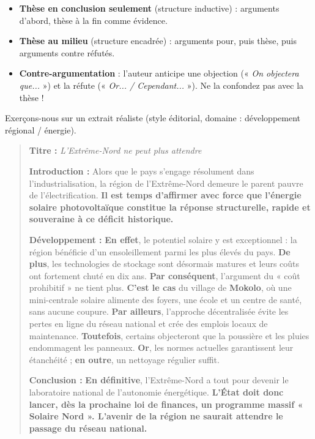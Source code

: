 \documentclass[11pt]{article}
\newcounter{popsec}
\newcounter{popsub}
\newcommand{\courssub}[1]{%
  \stepcounter{popsub}%
  \par\vspace{9pt}\noindent{\popxbold\fontsize{11.5}{13}\selectfont\color{popink}{\color{poporange}\thepopsec.\thepopsub}\hspace{6pt}#1}\par\nopagebreak\vspace{4pt}
}
\begin{document}
\begin{aretenir}
\begin{itemize}
    \item \textbf{Thèse en conclusion seulement} (structure inductive) : arguments d'abord, thèse à la fin comme évidence.
    \item \textbf{Thèse au milieu} (structure encadrée) : arguments pour, puis thèse, puis arguments contre réfutés.
    \item \textbf{Contre-argumentation} : l'auteur anticipe une objection (« \emph{On objectera que...} ») et la réfute (« \emph{Or... / Cependant...} »). Ne la confondez pas avec la thèse !
\end{itemize}
\end{aretenir}

\courssub{Application : repérage dans un éditorial}

Exerçons-nous sur un extrait réaliste (style éditorial, domaine : développement régional / énergie).

\begin{exemplebox}
\begin{quote}
\textbf{Titre :} \textit{L'Extrême-Nord ne peut plus attendre}

\textbf{Introduction :} Alors que le pays s'engage résolument dans l'industrialisation, la région de l'Extrême-Nord demeure le parent pauvre de l'électrification. \textbf{Il est temps d'affirmer avec force que l'énergie solaire photovoltaïque constitue la réponse structurelle, rapide et souveraine à ce déficit historique.}

\textbf{Développement :} \textbf{En effet}, le potentiel solaire y est exceptionnel : la région bénéficie d'un ensoleillement parmi les plus élevés du pays. \textbf{De plus}, les technologies de stockage sont désormais matures et leurs coûts ont fortement chuté en dix ans. \textbf{Par conséquent}, l'argument du « coût prohibitif » ne tient plus. \textbf{C'est le cas} du village de \textbf{Mokolo}, où une mini-centrale solaire alimente des foyers, une école et un centre de santé, sans aucune coupure. \textbf{Par ailleurs}, l'approche décentralisée évite les pertes en ligne du réseau national et crée des emplois locaux de maintenance. \textbf{Toutefois}, certains objecteront que la poussière et les pluies endommagent les panneaux. \textbf{Or}, les normes actuelles garantissent leur étanchéité ; \textbf{en outre}, un nettoyage régulier suffit.

\textbf{Conclusion :} \textbf{En définitive}, l'Extrême-Nord a tout pour devenir le laboratoire national de l'autonomie énergétique. \textbf{L'État doit donc lancer, dès la prochaine loi de finances, un programme massif « Solaire Nord ». L'avenir de la région ne saurait attendre le passage du réseau national.}
\end{quote}
\end{exemplebox}
\end{document}
